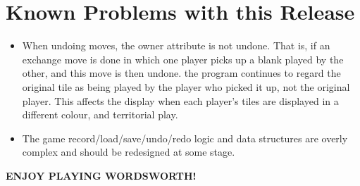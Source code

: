 \section{Known Problems with this Release}

\begin{itemize}
\item  When undoing moves, the owner attribute is not undone. That is,
if an exchange move is done in which one player picks up
a blank played by the other, and this move is then undone.
the program continues to regard the original tile as being
played by the player who picked it up, not the original player.
This affects the display when each player's tiles are
displayed in a different colour, and territorial play.
\item The game record/load/save/undo/redo logic and data structures
are overly complex and should be redesigned at some stage.
\end{itemize}

\begin{center}
\bf
ENJOY PLAYING WORDSWORTH!
\end{center}


